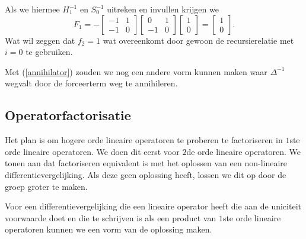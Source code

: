 \documentclass[a4paper,12pt]{article}
\begin{document}
\begin{example}
    Als we hiermee $H_1^{-1}$ en $S_0^{-1}$ uitreken en invullen krijgen we
    $$
        F_1 =
        -\left[ \begin{array}{cc}
                -1 & 1 \\
                -1 & 0
            \end{array}\right]
        \left[ \begin{array}{cc}
                0  & 1 \\
                -1 & 0
            \end{array}\right]
        \left[ \begin{array}{c}
                1 \\
                0
            \end{array}\right]=
        \left[ \begin{array}{c}
                1 \\
                0
            \end{array}\right].
    $$
    Wat wil zeggen dat $f_2 = 1$ wat overeenkomt door gewoon de recursierelatie met $i=0$ te gebruiken.
\end{example}


\begin{remark}
    Met (\ref{annihilator}) zouden we nog een andere vorm kunnen maken waar $\Delta^{-1}$ wegvalt door de forceerterm weg te annihileren.
\end{remark}

\subsection{Operatorfactorisatie}
Het plan is om hogere orde lineaire operatoren te proberen te factoriseren in $1$ste orde lineaire operatoren.
We doen dit eerst voor $2$de orde lineaire operatoren.
We tonen aan dat factoriseren equivalent is met het oplossen van een non-lineaire differentievergelijking.
Als deze geen oplossing heeft, lossen we dit op door de groep groter te maken.


\begin{theorem}
    Voor een differentievergelijking die een lineaire operator heeft die aan de uniciteit voorwaarde doet en
    die te schrijven is als een product van $1$ste orde lineaire operatoren kunnen
    we een vorm van de oplossing maken.
\end{theorem}
\end{document}

